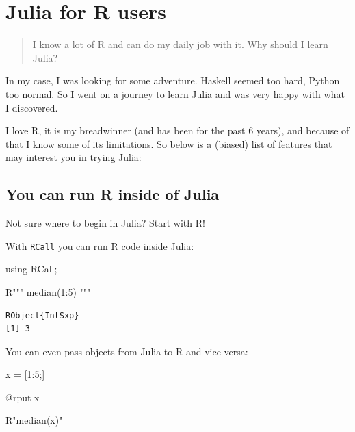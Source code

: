 \documentclass[
  letterpaper,
  DIV=11,
  numbers=noendperiod]{scrartcl}
\author{}
\date{2025-02-03}
\newenvironment{Shaded}{\begin{snugshade}}{\end{snugshade}}
\newcommand{\BuiltInTok}[1]{\textcolor[rgb]{0.00,0.23,0.31}{#1}}
\newcommand{\FloatTok}[1]{\textcolor[rgb]{0.68,0.00,0.00}{#1}}
\newcommand{\ImportTok}[1]{\textcolor[rgb]{0.00,0.46,0.62}{#1}}
\newcommand{\NormalTok}[1]{\textcolor[rgb]{0.00,0.23,0.31}{#1}}
\newcommand{\OperatorTok}[1]{\textcolor[rgb]{0.37,0.37,0.37}{#1}}
\newcommand{\PreprocessorTok}[1]{\textcolor[rgb]{0.68,0.00,0.00}{#1}}
\newcommand{\StringTok}[1]{\textcolor[rgb]{0.13,0.47,0.30}{#1}}
\begin{document}
\section{Julia for R users}\label{julia-for-r-users}

\begin{quote}
I know a lot of R and can do my daily job with it. Why should I learn
Julia?
\end{quote}

In my case, I was looking for some adventure. Haskell seemed too hard,
Python too normal. So I went on a journey to learn Julia and was very
happy with what I discovered.

I love R, it is my breadwinner (and has been for the past 6 years), and
because of that I know some of its limitations. So below is a (biased)
list of features that may interest you in trying Julia:

\subsection{You can run R inside of
Julia}\label{you-can-run-r-inside-of-julia}

Not sure where to begin in Julia? Start with R!

With \texttt{RCall} you can run R code inside Julia:

\begin{Shaded}
\begin{Highlighting}[]
\ImportTok{using} \BuiltInTok{RCall;}

\NormalTok{R}\StringTok{"""}
\StringTok{median(1:5)}
\StringTok{"""}
\end{Highlighting}
\end{Shaded}

\begin{verbatim}
RObject{IntSxp}
[1] 3
\end{verbatim}

You can even pass objects from Julia to R and vice-versa:

\begin{Shaded}
\begin{Highlighting}[]
\NormalTok{x }\OperatorTok{=}\NormalTok{ [}\FloatTok{1}\OperatorTok{:}\FloatTok{5}\NormalTok{;]}

\PreprocessorTok{@rput}\NormalTok{ x}

\NormalTok{R}\StringTok{"median(x)"}
\end{Highlighting}
\end{Shaded}
\end{document}
